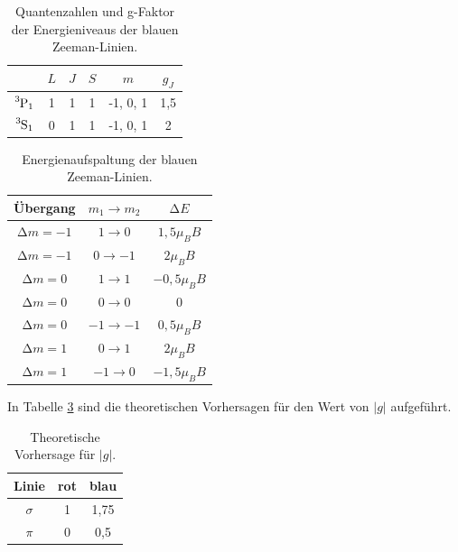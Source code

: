 \begin{table}
  \centering
  \caption{Quantenzahlen und g-Faktor der Energieniveaus der blauen Zeeman-Linien.}
  \begin{tabular}{c c c c c c}
    \toprule
    & $L$ & $J$ & $S$ & $m$ & $g_J$ \\
    \midrule
    $\ce{^{3}P_1}$ & 1 & 1 & 1 & -1, 0, 1 & 1,5 \\
    $\ce{^{3}S_1}$ & 0 & 1 & 1 & -1, 0, 1 & 2 \\
    \bottomrule
\end{tabular}
  \label{tab:blau1}
\end{table}
\begin{table}
  \centering
  \caption{Energienaufspaltung der blauen Zeeman-Linien.}
  \begin{tabular}{c c c}
    \toprule
    Übergang & $m_1 \rightarrow m_2$ & $\increment E$ \\
    \midrule
    $\increment m = -1$ & $1 \rightarrow 0$ & $1{,}5\mu_B B$ \\
    $\increment m = -1$ & $0 \rightarrow -1$ & $2\mu_B B$ \\
    \hline
    $\increment m = 0$ & $1 \rightarrow 1$ & $-0{,}5\mu_B B$ \\
    $\increment m = 0$ & $0 \rightarrow 0$ & 0 \\
    $\increment m = 0$ & $-1 \rightarrow -1$ & $0{,}5\mu_B B$ \\
    \hline
    $\increment m = 1$ & $0 \rightarrow 1$ & $2\mu_B B$ \\
    $\increment m = 1$ & $-1 \rightarrow 0$ & $-1{,}5\mu_B B$ \\
    \bottomrule
    \end{tabular}
  \label{tab:blau2}
\end{table}
In Tabelle \ref{tab:g} sind die theoretischen Vorhersagen für den Wert von $|g|$
aufgeführt.
\begin{table}
  \centering
  \caption{Theoretische Vorhersage für $|g|$.}
  \begin{tabular}{c c c}
    \toprule
    Linie & rot & blau \\
    \midrule
    $\sigma$ & 1 & 1,75 \\
    $\pi$ & 0 & 0,5 \\
    \bottomrule
    \end{tabular}
  \label{tab:g}
\end{table}
